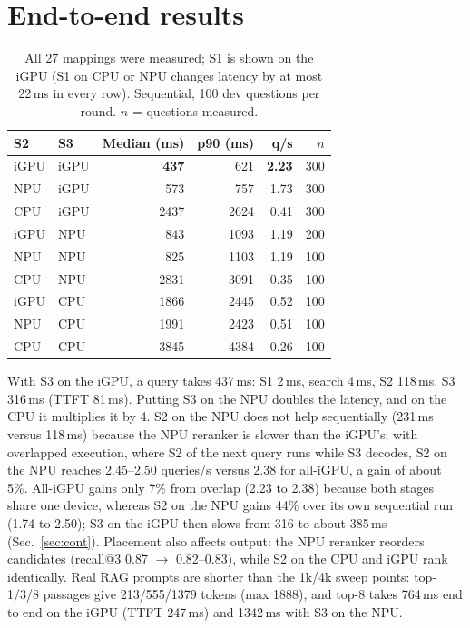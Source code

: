 \documentclass[10pt]{article}
\begin{document}
\section{End-to-end results}
\begin{table}[!htb]\centering\small
\caption{All 27 mappings were measured; S1 is shown on the iGPU (S1 on CPU or NPU changes latency by at most 22\,ms in every row). Sequential, 100 dev questions per round. $n$ = questions measured.}\label{tab:e2e}
\begin{tabular}{llrrrr}\toprule
S2 & S3 & Median (ms) & p90 (ms) & q/s & $n$\\\midrule
iGPU & iGPU & \textbf{437} & 621 & \textbf{2.23} & 300\\
NPU & iGPU & 573 & 757 & 1.73 & 300\\
CPU & iGPU & 2437 & 2624 & 0.41 & 300\\
iGPU & NPU & 843 & 1093 & 1.19 & 200\\
NPU & NPU & 825 & 1103 & 1.19 & 100\\
CPU & NPU & 2831 & 3091 & 0.35 & 100\\
iGPU & CPU & 1866 & 2445 & 0.52 & 100\\
NPU & CPU & 1991 & 2423 & 0.51 & 100\\
CPU & CPU & 3845 & 4384 & 0.26 & 100\\\bottomrule
\end{tabular}
\end{table}

With S3 on the iGPU, a query takes 437\,ms: S1 2\,ms, search 4\,ms, S2 118\,ms, S3 316\,ms (TTFT 81\,ms). Putting S3 on the NPU doubles the latency, and on the CPU it multiplies it by 4. S2 on the NPU does not help sequentially (231\,ms versus 118\,ms) because the NPU reranker is slower than the iGPU's; with overlapped execution, where S2 of the next query runs while S3 decodes, S2 on the NPU reaches 2.45--2.50 queries/s versus 2.38 for all-iGPU, a gain of about 5\%. All-iGPU gains only 7\% from overlap (2.23 to 2.38) because both stages share one device, whereas S2 on the NPU gains 44\% over its own sequential run (1.74 to 2.50); S3 on the iGPU then slows from 316 to about 385\,ms (Sec.~\ref{sec:cont}). Placement also affects output: the NPU reranker reorders candidates (recall@3 0.87 $\rightarrow$ 0.82--0.83), while S2 on the CPU and iGPU rank identically. Real RAG prompts are shorter than the 1k/4k sweep points: top-1/3/8 passages give 213/555/1379 tokens (max 1888), and top-8 takes 764\,ms end to end on the iGPU (TTFT 247\,ms) and 1342\,ms with S3 on the NPU.
\end{document}
